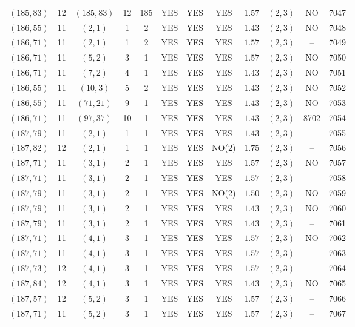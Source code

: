 \begin{longtable}{|c|c|c|c|c|c|c|c|c|c|c|c|}
$(185,83)$ & 12 & $(185,83)$ & 12 & 185 & YES & YES & YES & $1.57$ & $(2,3)$ & NO & 7047\\
$(186,55)$ & 11 & $(2,1)$ & 1 & 2 & YES & YES & YES & $1.43$ & $(2,3)$ & NO & 7048\\
$(186,71)$ & 11 & $(2,1)$ & 1 & 2 & YES & YES & YES & $1.57$ & $(2,3)$ & -- & 7049\\
$(186,71)$ & 11 & $(5,2)$ & 3 & 1 & YES & YES & YES & $1.57$ & $(2,3)$ & NO & 7050\\
$(186,71)$ & 11 & $(7,2)$ & 4 & 1 & YES & YES & YES & $1.43$ & $(2,3)$ & NO & 7051\\
$(186,55)$ & 11 & $(10,3)$ & 5 & 2 & YES & YES & YES & $1.43$ & $(2,3)$ & NO & 7052\\
$(186,55)$ & 11 & $(71,21)$ & 9 & 1 & YES & YES & YES & $1.43$ & $(2,3)$ & NO & 7053\\
$(186,71)$ & 11 & $(97,37)$ & 10 & 1 & YES & YES & YES & $1.43$ & $(2,3)$ & 8702 & 7054\\
$(187,79)$ & 11 & $(2,1)$ & 1 & 1 & YES & YES & YES & $1.43$ & $(2,3)$ & -- & 7055\\
$(187,82)$ & 12 & $(2,1)$ & 1 & 1 & YES & YES & NO(2) & $1.75$ & $(2,3)$ & -- & 7056\\
$(187,71)$ & 11 & $(3,1)$ & 2 & 1 & YES & YES & YES & $1.57$ & $(2,3)$ & NO & 7057\\
$(187,71)$ & 11 & $(3,1)$ & 2 & 1 & YES & YES & YES & $1.57$ & $(2,3)$ & -- & 7058\\
$(187,79)$ & 11 & $(3,1)$ & 2 & 1 & YES & YES & NO(2) & $1.50$ & $(2,3)$ & NO & 7059\\
$(187,79)$ & 11 & $(3,1)$ & 2 & 1 & YES & YES & YES & $1.43$ & $(2,3)$ & NO & 7060\\
$(187,79)$ & 11 & $(3,1)$ & 2 & 1 & YES & YES & YES & $1.43$ & $(2,3)$ & -- & 7061\\
$(187,71)$ & 11 & $(4,1)$ & 3 & 1 & YES & YES & YES & $1.57$ & $(2,3)$ & NO & 7062\\
$(187,71)$ & 11 & $(4,1)$ & 3 & 1 & YES & YES & YES & $1.57$ & $(2,3)$ & -- & 7063\\
$(187,73)$ & 12 & $(4,1)$ & 3 & 1 & YES & YES & YES & $1.57$ & $(2,3)$ & -- & 7064\\
$(187,84)$ & 12 & $(4,1)$ & 3 & 1 & YES & YES & YES & $1.43$ & $(2,3)$ & NO & 7065\\
$(187,57)$ & 12 & $(5,2)$ & 3 & 1 & YES & YES & YES & $1.57$ & $(2,3)$ & -- & 7066\\
$(187,71)$ & 11 & $(5,2)$ & 3 & 1 & YES & YES & YES & $1.57$ & $(2,3)$ & -- & 7067\\

\end{longtable}
